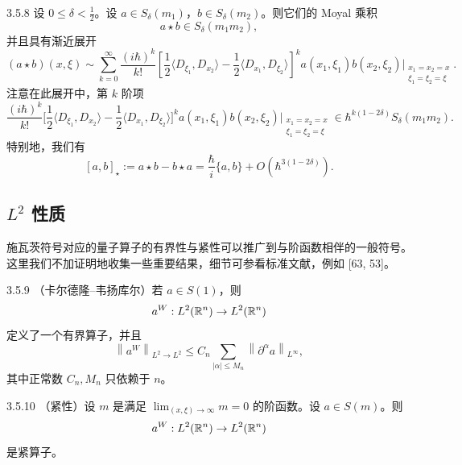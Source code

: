 \begin{theorem}{3.5.8}
  设 \(0\le\delta<\frac12\)。设 \(a\in S_\delta(m_1)\)，\(b\in S_\delta(m_2)\)。则它们的 Moyal 乘积
  \[
    a\star b\in S_\delta(m_1m_2),
  \]
  并且具有渐近展开
  \[
    (a\star b)(x,\xi)
    \sim\sum_{k=0}^{\infty}\frac{(i\hbar)^{k}}{k!}
    \left[\frac12\langle D_{\xi_1},D_{x_2}\rangle
      -\frac12\langle D_{x_1},D_{\xi_2}\rangle\right]^{k}
    a(x_1,\xi_1)b(x_2,\xi_2)
    \Big|_{\substack{x_1=x_2=x\\ \xi_1=\xi_2=\xi}}.
  \]
  注意在此展开中，第 \(k\) 阶项
  \[
    \frac{(i\hbar)^{k}}{k!}
    \Big[\frac12\langle D_{\xi_1},D_{x_2}\rangle
      -\frac12\langle D_{x_1},D_{\xi_2}\rangle\Big]^{k}
    a(x_1,\xi_1)b(x_2,\xi_2)
    \big|_{\substack{x_1=x_2=x\\ \xi_1=\xi_2=\xi}}
    \in\hbar^{k(1-2\delta)}S_\delta(m_1m_2).
  \]
  特别地，我们有
  \[
    [a,b]_\star:=a\star b-b\star a
    =\frac{\hbar}{i}\{a,b\}+O(\hbar^{3(1-2\delta)}).
  \]
\end{theorem}

\subsection{\(L^2\) 性质}

施瓦茨符号对应的量子算子的有界性与紧性可以推广到与阶函数相伴的一般符号。这里我们不加证明地收集一些重要结果，细节可参看标准文献，例如 [63, 53]。

\begin{theorem}{3.5.9}
  （卡尔德隆–韦扬库尔）若 \(a\in S(1)\)，则
  \[
    a^W:L^2(\mathbb{R}^n)\to L^2(\mathbb{R}^n)
  \]
  定义了一个有界算子，并且
  \[
    \left\|a^W\right\|_{L^2\to L^2}
    \le C_n\sum_{|\alpha|\le M_n}
    \left\|\partial^\alpha a\right\|_{L^\infty},
  \]
  其中正常数 \(C_n,M_n\) 只依赖于 \(n\)。
\end{theorem}

\begin{theorem}{3.5.10}
  （紧性）设 \(m\) 是满足 \(\lim_{(x,\xi)\to\infty}m=0\) 的阶函数。设 \(a\in S(m)\)。则
  \[
    a^W:L^2(\mathbb{R}^n)\to L^2(\mathbb{R}^n)
  \]
  是紧算子。
\end{theorem}


